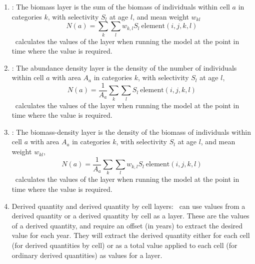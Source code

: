 \begin{enumerate}
\item {}: The biomass layer is the sum of the biomass of individuals within cell $a$ in categories $k$, with selectivity $S_l$ at age $l$, and mean weight $w_{kl}$
\begin{equation}
  N(a) = \sum\limits_{k} \sum\limits_l w_{k,l} S_l \ \text{element}(i,j,k,l) 
\end{equation}
\SPM\ calculates the values of the layer when running the model at the point in time where the value is required.

\item {}: The abundance density layer is the density of the number of individuals within cell $a$ with area $A_a$ in categories $k$, with selectivity $S_l$ at age $l$,
\begin{equation}
  N(a) = \frac{1}{A_a} \sum\limits_{k} \sum\limits_l S_l \ \text{element}(i,j,k,l)
\end{equation}
\SPM\ calculates the values of the layer when running the model at the point in time where the value is required.

\item {}: The biomass-density layer is the density of the biomass of individuals within cell $a$ with area $A_a$ in categories $k$, with selectivity $S_l$ at age $l$, and mean weight $w_{kl}$,
\begin{equation}
  N(a) = \frac{1}{A_a} \sum\limits_{k} \sum\limits_l w_{k,l} S_l \ \text{element}(i,j,k,l)
\end{equation}
\SPM\ calculates the values of the layer when running the model at the point in time where the value is required.

\item {Derived quantity and derived quantity by cell layers}\label{derived quantity layer}: \SPM\ can use values from a derived quantity or a derived quantity by cell as a layer. These are the values of a derived quantity, and require an offset (in years) to extract the desired value for each year. They will extract the derived quantity either for each cell (for derived quantities by cell) or as a total value applied to each cell (for ordinary derived quantities) as values for a layer.


\end{enumerate}
